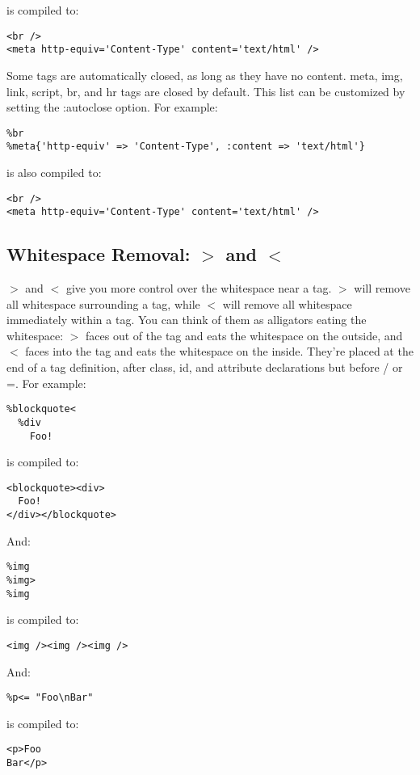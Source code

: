 \documentclass[9pt]{article}
\begin{document}
 is compiled to:
\begin{verbatim}
<br />
<meta http-equiv='Content-Type' content='text/html' />
\end{verbatim}


 Some tags are automatically closed, as long as they have no content. meta, img, link, script, br, and hr tags are closed by default. This list can be customized by setting the :autoclose option. For example:
\begin{verbatim}
%br
%meta{'http-equiv' => 'Content-Type', :content => 'text/html'}
\end{verbatim}


 is also compiled to:
\begin{verbatim}
<br />
<meta http-equiv='Content-Type' content='text/html' />
\end{verbatim}
\subsection{Whitespace Removal: $>$ and $<$}


 $>$ and $<$ give you more control over the whitespace near a tag. $>$ will remove all whitespace surrounding a tag, while $<$ will remove all whitespace immediately within a tag. You can think of them as alligators eating the whitespace: $>$ faces out of the tag and eats the whitespace on the outside, and $<$ faces into the tag and eats the whitespace on the inside. They’re placed at the end of a tag definition, after class, id, and attribute declarations but before / or =. For example:
\begin{verbatim}
%blockquote<
  %div
    Foo!
\end{verbatim}


 is compiled to:
\begin{verbatim}
<blockquote><div>
  Foo!
</div></blockquote>
\end{verbatim}


 And:
\begin{verbatim}
%img
%img>
%img
\end{verbatim}


 is compiled to:
\begin{verbatim}
<img /><img /><img />
\end{verbatim}


 And:
\begin{verbatim}
%p<= "Foo\nBar"
\end{verbatim}


 is compiled to:
\begin{verbatim}
<p>Foo
Bar</p>
\end{verbatim}
\end{document}
